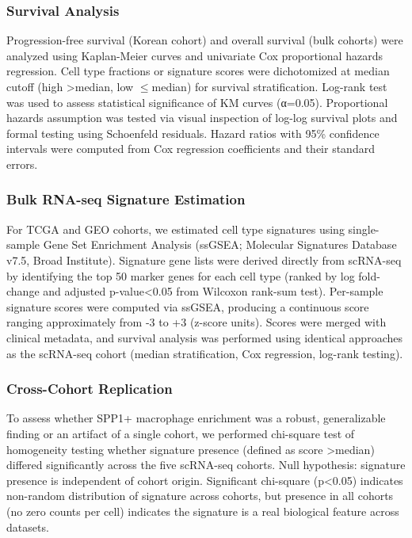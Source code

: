 \documentclass[12pt,twoside]{article}
\begin{document}
\subsubsection{Survival Analysis}

Progression-free survival (Korean cohort) and overall survival (bulk cohorts) were analyzed using Kaplan-Meier curves and univariate Cox proportional hazards regression. Cell type fractions or signature scores were dichotomized at median cutoff (high >median, low $\leq$median) for survival stratification. Log-rank test was used to assess statistical significance of KM curves (α=0.05). Proportional hazards assumption was tested via visual inspection of log-log survival plots and formal testing using Schoenfeld residuals. Hazard ratios with 95\% confidence intervals were computed from Cox regression coefficients and their standard errors.

\subsubsection{Bulk RNA-seq Signature Estimation}

For TCGA and GEO cohorts, we estimated cell type signatures using single-sample Gene Set Enrichment Analysis (ssGSEA; Molecular Signatures Database v7.5, Broad Institute). Signature gene lists were derived directly from scRNA-seq by identifying the top 50 marker genes for each cell type (ranked by log fold-change and adjusted p-value<0.05 from Wilcoxon rank-sum test). Per-sample signature scores were computed via ssGSEA, producing a continuous score ranging approximately from -3 to +3 (z-score units). Scores were merged with clinical metadata, and survival analysis was performed using identical approaches as the scRNA-seq cohort (median stratification, Cox regression, log-rank testing).

\subsubsection{Cross-Cohort Replication}

To assess whether SPP1+ macrophage enrichment was a robust, generalizable finding or an artifact of a single cohort, we performed chi-square test of homogeneity testing whether signature presence (defined as score >median) differed significantly across the five scRNA-seq cohorts. Null hypothesis: signature presence is independent of cohort origin. Significant chi-square (p<0.05) indicates non-random distribution of signature across cohorts, but presence in all cohorts (no zero counts per cell) indicates the signature is a real biological feature across datasets.
\end{document}
